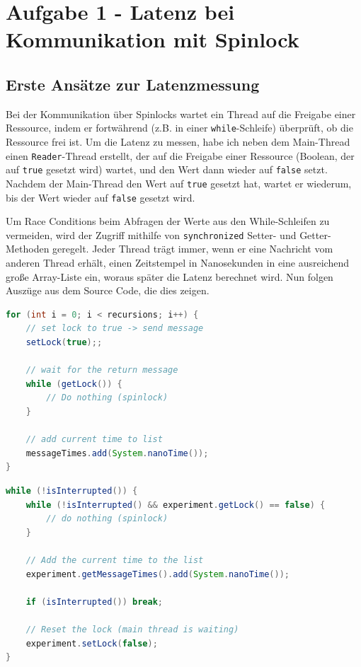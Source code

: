 \documentclass[12pt]{article}
\begin{document}
\section{Aufgabe 1 - Latenz bei Kommunikation mit Spinlock}
\subsection{Erste Ansätze zur Latenzmessung}
Bei der Kommunikation über Spinlocks wartet ein Thread auf die Freigabe einer Ressource, indem er fortwährend (z.B. in einer \texttt{while}-Schleife) überprüft, ob die Ressource frei ist. 
Um die Latenz zu messen, habe ich neben dem Main-Thread einen \texttt{Reader}-Thread erstellt, der auf die Freigabe einer Ressource (Boolean, der auf \texttt{true} gesetzt wird) wartet, und den Wert dann wieder auf \texttt{false} setzt. 
Nachdem der Main-Thread den Wert auf \texttt{true} gesetzt hat, wartet er wiederum, bis der Wert wieder auf \texttt{false} gesetzt wird.

Um Race Conditions beim Abfragen der Werte aus den While-Schleifen zu vermeiden, wird der Zugriff mithilfe von \texttt{synchronized} Setter- und Getter-Methoden geregelt.
Jeder Thread trägt immer, wenn er eine Nachricht vom anderen Thread erhält, einen Zeitstempel in Nanosekunden in eine ausreichend große Array-Liste ein, woraus später die Latenz berechnet wird.
Nun folgen Auszüge aus dem Source Code, die dies zeigen.

\begin{lstlisting}[language=java,caption={Spinlocks: Latenzmessung im Main Thread}]
for (int i = 0; i < recursions; i++) {
	// set lock to true -> send message
	setLock(true);;
	
	// wait for the return message
	while (getLock()) {
		// Do nothing (spinlock)
	}
	
	// add current time to list
	messageTimes.add(System.nanoTime());
}
\end{lstlisting}

\begin{lstlisting}[language=java,caption={Spinlocks: Latenzmessung im Reader Thread}]
while (!isInterrupted()) {
	while (!isInterrupted() && experiment.getLock() == false) {
		// do nothing (spinlock)
	}
	
	// Add the current time to the list
	experiment.getMessageTimes().add(System.nanoTime());
	
	if (isInterrupted()) break;
	
	// Reset the lock (main thread is waiting)
	experiment.setLock(false);
}
\end{lstlisting}
\end{document}
